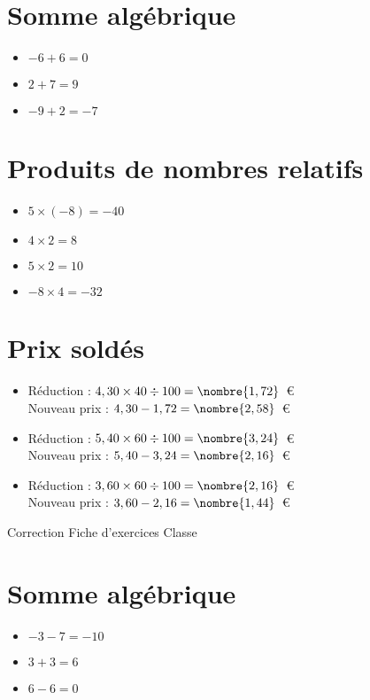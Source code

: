 \documentclass[a4paper,11pt,fleqn]{article}
\begin{document}
\section{Somme algébrique}
\begin{itemize}

  \item $-6 +6=0$
  \item $2 +7=9$
  \item $-9 +2=-7$
\end{itemize}

\section{Produits de nombres relatifs}
\begin{itemize}

  \item $5\times(-8)=-40$
  \item $4\times2=8$
  \item $5\times2=10$
  \item $-8\times4=-32$
\end{itemize}

\section{Prix soldés}
\begin{itemize}

  \item Réduction : $4,30\times40\div100=\nombre{1,72}$~€\\
  Nouveau prix : $4,30-1,72=\nombre{2,58}$~€
  \item Réduction : $5,40\times60\div100=\nombre{3,24}$~€\\
  Nouveau prix : $5,40-3,24=\nombre{2,16}$~€
  \item Réduction : $3,60\times60\div100=\nombre{2,16}$~€\\
  Nouveau prix : $3,60-2,16=\nombre{1,44}$~€
\end{itemize}
\newpage
\setcounter{exo}{0}
\setcounter{section}{0}
{Correction} \hfill {\huge Fiche d'exercices } \hfill {Classe}

\section{Somme algébrique}
\begin{itemize}

  \item $-3 -7=-10$
  \item $3 +3=6$
  \item $6 -6=0$
\end{itemize}
\end{document}
